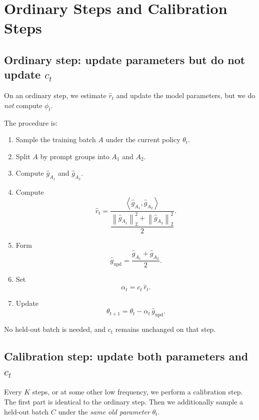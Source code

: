 \documentclass[11pt,a4paper]{article}
\newcommand{\norm}[1]{\left\lVert #1 \right\rVert_2}
\newcommand{\ip}[2]{\left\langle #1,#2 \right\rangle}
\newcommand{\ghat}{\hat g}
\newcommand{\rhat}{\hat r_t}
\newcommand{\phit}{\phi_t}
\begin{document}
\section{Ordinary Steps and Calibration Steps}
\subsection{Ordinary step: update parameters but do not update $c_t$}
On an ordinary step, we estimate $\rhat$ and update the model parameters, but we do \emph{not} compute $\phit$.

The procedure is:
\begin{enumerate}[label=\arabic*., leftmargin=2em]
    \item Sample the training batch $A$ under the current policy $\theta_t$.
    \item Split $A$ by prompt groups into $A_1$ and $A_2$.
    \item Compute $\ghat_{A_1}$ and $\ghat_{A_2}$.
    \item Compute
    \begin{equation*}
    \rhat = \frac{\ip{\ghat_{A_1}}{\ghat_{A_2}}}{\dfrac{\norm{\ghat_{A_1}}^2 + \norm{\ghat_{A_2}}^2}{2}}.
    \end{equation*}
    \item Form
    \begin{equation*}
    \ghat_{\mathrm{upd}} = \frac{\ghat_{A_1}+\ghat_{A_2}}{2}.
    \end{equation*}
    \item Set
    \begin{equation*}
    \alpha_t = c_t\,\rhat.
    \end{equation*}
    \item Update
    \begin{equation*}
    \theta_{t+1} = \theta_t - \alpha_t\,\ghat_{\mathrm{upd}}.
    \end{equation*}
\end{enumerate}
No held-out batch is needed, and $c_t$ remains unchanged on that step.

\subsection{Calibration step: update both parameters and $c_t$}
Every $K$ steps, or at some other low frequency, we perform a calibration step. The first part is identical to the ordinary step. Then we additionally sample a held-out batch $C$ under the \emph{same old parameter} $\theta_t$.
\end{document}
